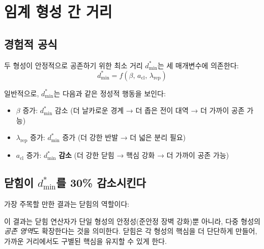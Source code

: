 \section{임계 형성 간 거리}
\label{sec:critical-distance}

\subsection{경험적 공식}

두 형성이 안정적으로 공존하기 위한 최소 거리 $d_{\min}^*$는 세 매개변수에 의존한다:
\begin{equation}
    d_{\min}^* = f(\beta,\, a_{\mathrm{cl}},\, \lambda_{\mathrm{rep}})
    \label{eq:d-min-formula}
\end{equation}

일반적으로, $d_{\min}^*$는 다음과 같은 정성적 행동을 보인다:
\begin{itemize}
    \item $\beta$ 증가: $d_{\min}^*$ 감소 (더 날카로운 경계 → 더 좁은 전이 대역 → 더 가까이 공존 가능)
    \item $\lambda_{\mathrm{rep}}$ 증가: $d_{\min}^*$ 증가 (더 강한 반발 → 더 넓은 분리 필요)
    \item $a_{\mathrm{cl}}$ 증가: $d_{\min}^*$ \textbf{감소} (더 강한 닫힘 → 핵심 강화 → 더 가까이 공존 가능)
\end{itemize}

\subsection{닫힘이 $d_{\min}^*$를 30\% 감소시킨다}

가장 주목할 만한 결과는 닫힘의 역할이다:

\begin{center}
\end{center}

이 결과는 닫힘 연산자가 단일 형성의 안정성(준안정 장벽 강화)뿐 아니라, 다중 형성의 \emph{공존 영역}도 확장한다는 것을 의미한다. 닫힘은 각 형성의 핵심을 더 단단하게 만들어, 가까운 거리에서도 구별된 핵심을 유지할 수 있게 한다.

